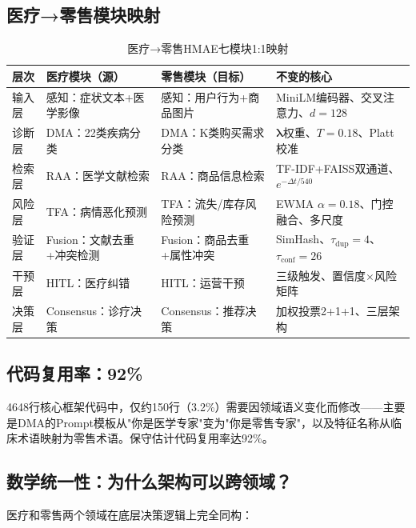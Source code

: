 \documentclass[11pt,a4paper]{ctexart}
\begin{document}
\subsection{医疗→零售模块映射}

\begin{table}[H]
\centering
\small
\begin{tabular}{p{2.2cm}p{4.5cm}p{4.5cm}p{3cm}}
\toprule
\textbf{层次} & \textbf{医疗模块（源）} & \textbf{零售模块（目标）} & \textbf{不变的核心} \\
\midrule
输入层 & 感知：症状文本+医学影像 & 感知：用户行为+商品图片 & MiniLM编码器、交叉注意力、$d=128$ \\
诊断层 & DMA：22类疾病分类 & DMA：K类购买需求分类 & $\boldsymbol{\lambda}$权重、$T=0.18$、Platt校准 \\
检索层 & RAA：医学文献检索 & RAA：商品信息检索 & TF-IDF+FAISS双通道、$e^{-\Delta t/540}$ \\
风险层 & TFA：病情恶化预测 & TFA：流失/库存风险预测 & EWMA $\alpha=0.18$、门控融合、多尺度 \\
验证层 & Fusion：文献去重+冲突检测 & Fusion：商品去重+属性冲突 & SimHash、$\tau_{\text{dup}}=4$、$\tau_{\text{conf}}=26$ \\
干预层 & HITL：医疗纠错 & HITL：运营干预 & 三级触发、置信度$\times$风险矩阵 \\
决策层 & Consensus：诊疗决策 & Consensus：推荐决策 & 加权投票2+1+1、三层架构 \\
\bottomrule
\end{tabular}
\caption{医疗→零售HMAE七模块1:1映射}
\end{table}

\subsection{代码复用率：92\%}

4648行核心框架代码中，仅约150行（3.2\%）需要因领域语义变化而修改——主要是DMA的Prompt模板从"你是医学专家"变为"你是零售专家"，以及特征名称从临床术语映射为零售术语。保守估计代码复用率达92\%。

\subsection{数学统一性：为什么架构可以跨领域？}

医疗和零售两个领域在底层决策逻辑上完全同构：
\end{document}
